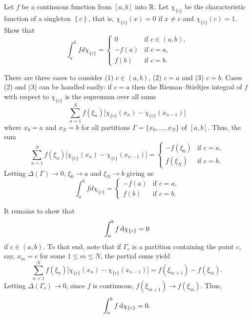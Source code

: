 \begin{problem}
  Let \(f\) be a continuous function from \([a,b]\) into \(\mathbb{R}\). Let
  \(\chi_{\{c\}}\) be the characteristic function of a singleton
  \(\left\{c\right\}\), that is, \(\chi_{\{c\}}(x)=0\) if \(x\neq c\) and
  \(\chi_{\{c\}}(c)=1\). Show that
  \[
    \int_a^b f d \chi_{\{c\}}=
    \begin{cases}
      0&\text{if \(c\in(a,b)\),}\\
      -f(a)&\text{if \(c=a\),}\\
      f(b)&\text{if \(c=b\).}
    \end{cases}
  \]
\end{problem}
\begin{solution}
  There are three cases to consider (1) \(c\in(a,b)\), (2) \(c=a\) and (3)
  \(c=b\). Cases (2) and (3) can be handled easily: if \(c=a\) then the
  Rieman--Stieltjes integral of \(f\) with respect to \(\chi_{\{c\}}\) is
  the supremum over all sums
  \[
    \sum_{n=1}^N f(\xi_n)\bigl[ \chi_{\{c\}}(x_n)-\chi_{\{c\}}(x_{n-1})\bigr]
  \]
  where \(x_0=a\) and \(x_N=b\) for all partitions
  \(\Gamma=\{x_0,\dotsc,x_N\}\) of \([a,b]\). Thus, the sum
  \[
    \sum_{n=1}^N
    f(\xi_n)\bigl[\chi_{\{c\}}(x_n)-\chi_{\{c\}}(x_{n-1})\bigr]
    =\begin{cases}
      -f(\xi_0)&\text{if \(c=a\),}\\
      f(\xi_N)&\text{if \(c=b\).}
    \end{cases}
  \]
  Letting \(\Delta(\Gamma)\to 0\), \(\xi_0\to a\) and \(\xi_N\to b\) giving
  us
  \[
    \int_a^b f d \chi_{\{c\}}=
    \begin{cases}
      -f(a)&\text{if \(c=a\),}\\
      f(b)&\text{if \(c=b\).}
    \end{cases}
  \]

  It remains to show that
  \[
    \int_a^b f\mathop{}\!\mathrm{d}\chi_{\{c\}}=0
  \]
  if \(c\in(a,b)\). To that end, note that if \(\Gamma_c\) is a partition
  containing the point \(c\), say, \(x_m=c\) for some \(1\leq m\leq N\),
  the partial sums yield
  \[
    \sum_{n=1}^N
    f(\xi_n)\bigl[\chi_{\{c\}}(x_n)-\chi_{\{c\}}(x_{n-1})\bigr]
    =f(\xi_{m+1})-f(\xi_m).
  \]
  Letting \(\Delta(\Gamma_c)\to 0\), since \(f\) is continuous,
  \(f(\xi_{m+1})\to f(\xi_m)\). Thus,
  \[
    \int_a^b f\mathop{}\!\mathrm{d}\chi_{\{c\}}=0.
  \]
\end{solution}

